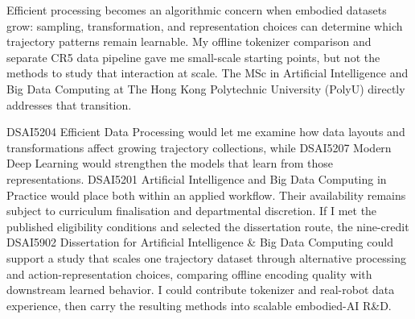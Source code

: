 Efficient processing becomes an algorithmic concern when embodied datasets grow: sampling, transformation, and representation choices can determine which trajectory patterns remain learnable. My offline tokenizer comparison and separate CR5 data pipeline gave me small-scale starting points, but not the methods to study that interaction at scale. The MSc in Artificial Intelligence and Big Data Computing at The Hong Kong Polytechnic University (PolyU) directly addresses that transition.

DSAI5204 Efficient Data Processing would let me examine how data layouts and transformations affect growing trajectory collections, while DSAI5207 Modern Deep Learning would strengthen the models that learn from those representations. DSAI5201 Artificial Intelligence and Big Data Computing in Practice would place both within an applied workflow. Their availability remains subject to curriculum finalisation and departmental discretion. If I met the published eligibility conditions and selected the dissertation route, the nine-credit DSAI5902 Dissertation for Artificial Intelligence \& Big Data Computing could support a study that scales one trajectory dataset through alternative processing and action-representation choices, comparing offline encoding quality with downstream learned behavior. I could contribute tokenizer and real-robot data experience, then carry the resulting methods into scalable embodied-AI R\&D.

